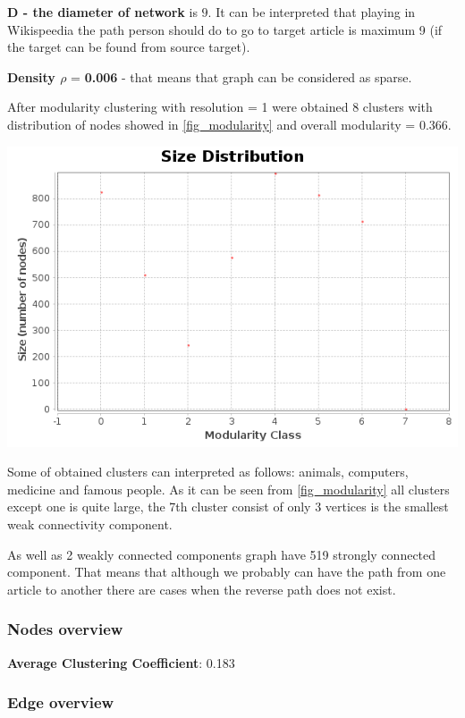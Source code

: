 \textbf{D - the diameter of network} is \textbf{$9$}. It can be interpreted that playing in Wikispeedia the path person should do to go to target article is maximum 9 (if the target can be found from source target).

\textbf{Density $\rho$} = \textbf{0.006} - that means that graph can be considered as sparse.

After modularity clustering with resolution = 1 were obtained 8 clusters with distribution of nodes showed in \ref{fig_modularity} and overall modularity = \textbf{$0.366$}.

\begin{center}
    \includegraphics[width=0.75\linewidth]{../results/modularity_result/communities-size-distribution.png}
    \label{fig_modularity}
\end{center}

Some of obtained clusters can interpreted as follows: animals, computers, medicine and famous people. As it can be seen from \ref{fig_modularity} all clusters except one is quite large, the 7th cluster consist of only 3 vertices is the smallest weak connectivity component.

As well as 2 weakly connected components graph have 519 strongly connected component. That means that although we probably can have the path from one article to another there are cases when the reverse path does not exist. 

\subsubsection*{Nodes overview}

\textbf{Average Clustering Coefficient}: 0.183

\subsubsection*{Edge overview}

